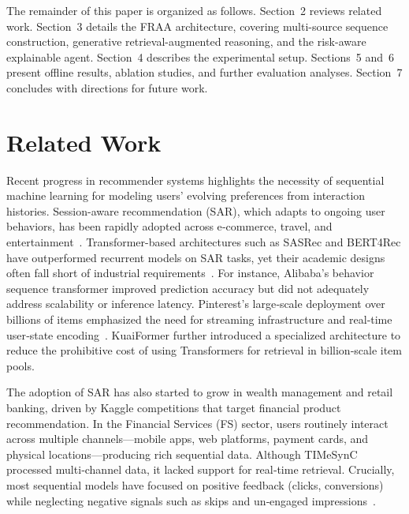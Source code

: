 \documentclass[10pt,twocolumn]{article}
\begin{document}
The remainder of this paper is organized as follows. Section~2 reviews related work. Section~3 details the FRAA architecture, covering multi-source sequence construction, generative retrieval-augmented reasoning, and the risk-aware explainable agent. Section~4 describes the experimental setup. Sections~5 and~6 present offline results, ablation studies, and further evaluation analyses. Section~7 concludes with directions for future work.

\section{Related Work}

Recent progress in recommender systems highlights the necessity of sequential machine learning for modeling users’ evolving preferences from interaction histories. 
Session-aware recommendation (SAR), which adapts to ongoing user behaviors, has been rapidly adopted across e‑commerce, travel, and entertainment~\cite{arxiv-2511.23260,arxiv-2510.19980,arxiv-2512.08963}. 
Transformer-based architectures such as SASRec and BERT4Rec have outperformed recurrent models on SAR tasks, yet their academic designs often fall short of industrial requirements~\cite{arxiv-2512.14619,arxiv-2512.13149}. 
For instance, Alibaba’s behavior sequence transformer improved prediction accuracy but did not adequately address scalability or inference latency. 
Pinterest’s large‑scale deployment over billions of items emphasized the need for streaming infrastructure and real‑time user‑state encoding~\cite{arxiv-2512.12295,arxiv-2512.12461}. 
KuaiFormer further introduced a specialized architecture to reduce the prohibitive cost of using Transformers for retrieval in billion‑scale item pools.

The adoption of SAR has also started to grow in wealth management and retail banking, driven by Kaggle competitions that target financial product recommendation. 
In the Financial Services (FS) sector, users routinely interact across multiple channels—mobile apps, web platforms, payment cards, and physical locations—producing rich sequential data. 
Although TIMeSynC processed multi‑channel data, it lacked support for real‑time retrieval. 
Crucially, most sequential models have focused on positive feedback (clicks, conversions) while neglecting negative signals such as skips and un‑engaged impressions~\cite{arxiv-2510.25800,arxiv-2510.04102}.
\end{document}
